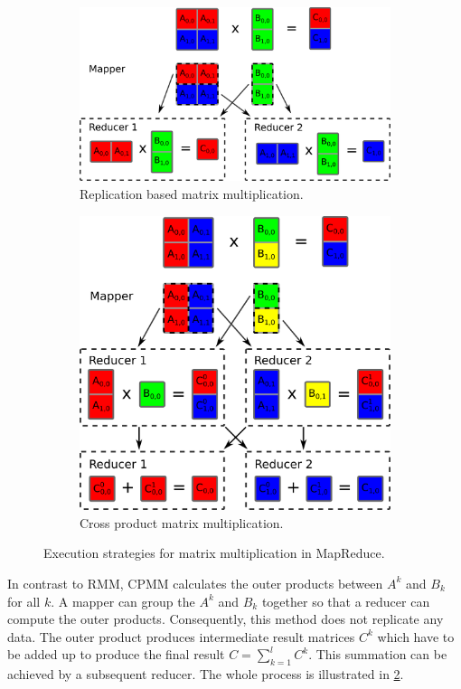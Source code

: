 \begin{figure}[h!]
	\centering
	\begin{subfigure}{.43\linewidth}
		\centering
		\includegraphics[width=0.99\linewidth]{images/rmm.png}
		\caption{Replication based matrix multiplication.}
		\label{fig:RMM}
	\end{subfigure}
	\hfill
	\begin{subfigure}{.43\linewidth}
		\centering
		\includegraphics[width=0.8\linewidth]{images/cpmm.png}
		\caption{Cross product matrix multiplication.}
		\label{fig:CPMM}
	\end{subfigure}
	\caption{Execution strategies for matrix multiplication in MapReduce.}
	\label{fig:MMs}
\end{figure}

In contrast to RMM, CPMM calculates the outer products between $A^k$ and $B_k$ for all $k$. 
A mapper can group the $A^k$ and $B_k$ together so that a reducer can compute the outer products. 
Consequently, this method does not replicate any data. 
The outer product produces intermediate result matrices $C^k$ which have to be added up to produce the final result $C=\sum_{k=1}^{l} C^k$. 
This summation can be achieved by a subsequent reducer. 
The whole process is illustrated in \cref{fig:CPMM}. 


